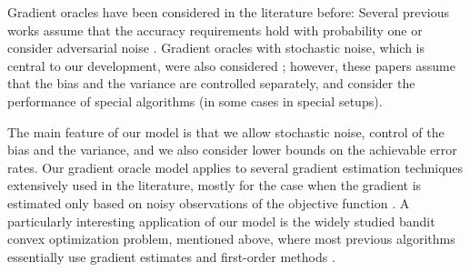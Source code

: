 Gradient oracles have been considered in the literature before: Several previous works assume that the accuracy requirements hold with probability one \citep{dAsp08,Baes09,DeGliNe14} or consider adversarial noise \citep{SchRoBa11}. Gradient oracles with stochastic noise, which is central to our development, were also considered \citep{JN11a,Hon12,DvoGa15}; however, these papers assume that the bias and the variance are controlled separately, and consider the performance of special algorithms (in some cases in special setups).

The main feature of our model is that we allow stochastic noise, control of the bias and the variance, and we also consider lower bounds on the achievable error rates. Our gradient oracle model applies to several gradient estimation techniques extensively used in the literature, mostly for the case when the gradient is estimated only based on noisy observations of the objective function \citep{katkul,kushcla,spall1992multivariate,spall1997one,Dip03:AoS,bhatnagar-book,duchi2015optimal}. A particularly interesting application of our model is the widely studied bandit convex optimization problem,
mentioned above,
where most previous algorithms 
essentially use gradient estimates and first-order methods 
\citep{PoTsy90,flaxman2005online,AbHaRa08,AgDeXi10,Ne11:TR,AgFoHsuKaRa13:SIAM,HaLe14:SOC}.


